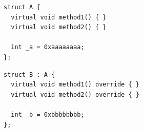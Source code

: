 \begin{frame}[fragile]
\begin{yesblock}
\begin{twocols}
\begin{lstlisting}[basicstyle=\scriptsize]
struct A {
  virtual void method1() { }
  virtual void method2() { }

  int _a = 0xaaaaaaaa;
};
\end{lstlisting}
\twocolssep
\begin{lstlisting}[basicstyle=\scriptsize]
struct B : A {
  virtual void method1() override { }
  virtual void method2() override { }

  int _b = 0xbbbbbbbb;
};
\end{lstlisting}
\end{twocols}
\end{yesblock}
\pause
{}
\pause
{}

\end{frame}






